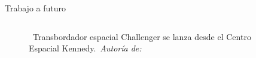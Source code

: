 \begin{frame}{Trabajo a futuro}
    \begin{columns}
        \begin{column}{0.4\textwidth}
            \centering
            \begin{figure}[H]
                \centering
                \vspace{-0.25cm}
                \caption{\tiny~Transbordador espacial Challenger se lanza desde el Centro Espacial Kennedy.~\textit{Autoría de:}~\cite{nasa_challenger_unsplash}}%
                \label{fig:PyQt_logo}
            \end{figure}
        \end{column}
        \begin{column}{0.6\textwidth}

\end{column}
\end{columns}
\end{frame}
